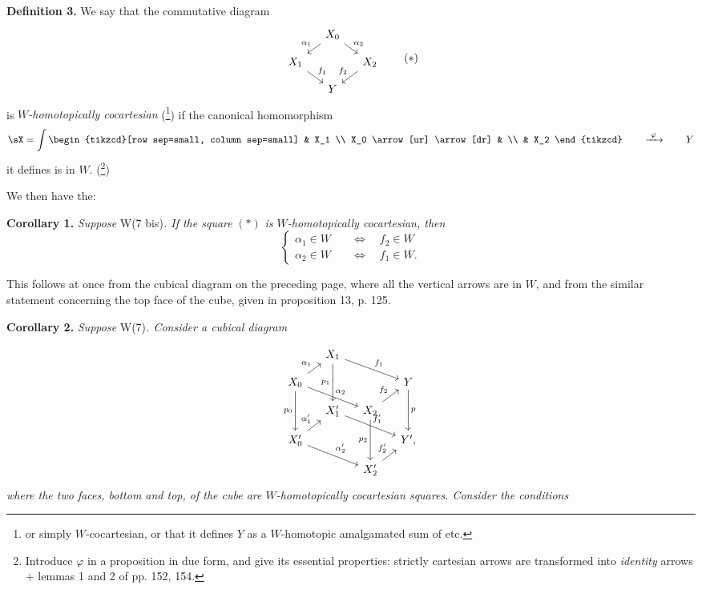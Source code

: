 \setcounter{footnote}{85}
\textbf{Definition 3.} We say that the commutative diagram
\[
\begin{tikzcd}[row sep=small, column sep=small]
 & X_0 \arrow[dl, "\alpha_1"'] \arrow[dr, "\alpha_2"] & \\
X_1 \arrow[dr, "f_1"] & & X_2 \arrow[dl, "f_2"'] \\
 & Y &
\end{tikzcd}
\tag*{$(*)$}
\]
is \textit{$W$-homotopically cocartesian} (\footnote{or simply $W$-cocartesian, or that it defines $Y$ as a $W$-homotopic amalgamated sum of etc.}) if the canonical homomorphism
\[
\sX = \int
\begin{tikzcd}[row sep=small, column sep=small]
 & X_1 \\
X_0 \arrow[ur] \arrow[dr] & \\
 & X_2
\end{tikzcd}
\qquad \xrightarrow{\ \varphi\ } \qquad Y
\]
it defines is in $W$. (\footnote{Introduce $\varphi$ in a proposition in due form, and give its essential properties: strictly cartesian arrows are transformed into \textit{identity} arrows $+$ lemmas 1 and 2 of pp. 152, 154.})

We then have the:

\textbf{Corollary 1.} \textit{Suppose} W(7 bis)\textit{. If the square} $(*)$ \textit{is $W$-homotopically cocartesian, then}
\[
\left\{
\begin{aligned}
\alpha_1 \in W &\quad\iff\quad f_2 \in W \\
\alpha_2 \in W &\quad\iff\quad f_1 \in W.
\end{aligned}
\right.
\]

This follows at once from the cubical diagram on the preceding page, where all the vertical arrows are in $W$, and from the similar statement concerning the top face of the cube, given in proposition 13, p. 125.

\textbf{Corollary 2.} \textit{Suppose} W(7)\textit{. Consider a cubical diagram}

\[
\begin{tikzcd}[row sep=small, column sep=small]
 & X_1 \arrow[dd, "p_1"'] \arrow[rrd, "f_1"] & & \\
X_0 \arrow[ru, "\alpha_1"] \arrow[rrd, "\alpha_2"] \arrow[dd, "p_0"'] & & & Y \arrow[dd, "p"] \\
 & X'_1 \arrow[rrd, "f'_1"] & X_2 \arrow[ru, "f_2"] \arrow[dd, "p_2"'] & \\
X'_0 \arrow[ru, "\alpha'_1"] \arrow[rrd, "\alpha'_2"] & & & Y', \\
 & & X'_2 \arrow[ru, "f'_2"] &
\end{tikzcd}
\]
\textit{where the two faces, bottom and top, of the cube are $W$-homotopically cocartesian squares. Consider the conditions}

